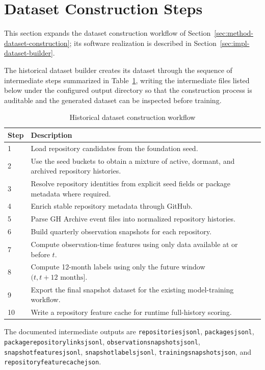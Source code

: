 \section{Dataset Construction Steps}
\label{appendix:dataset-construction}

This section expands the dataset construction workflow of Section~\ref{sec:method-dataset-construction}; its software realization is described in Section~\ref{sec:impl-dataset-builder}.

The historical dataset builder creates its dataset through the sequence of intermediate steps summarized in Table~\ref{tab:method-dataset-flow}, writing the intermediate files listed below under the configured output directory so that the construction process is auditable and the generated dataset can be inspected before training.

\begin{table}[htbp]
\centering
\caption{Historical dataset construction workflow}
\label{tab:method-dataset-flow}
\begin{tabular}{p{} p{}}
\hline
\textbf{Step} & \textbf{Description} \\
\hline
1 & Load repository candidates from the foundation seed. \\
2 & Use the seed buckets to obtain a mixture of active, dormant, and archived repository histories. \\
3 & Resolve repository identities from explicit seed fields or package metadata where required. \\
4 & Enrich stable repository metadata through GitHub. \\
5 & Parse GH Archive event files into normalized repository histories. \\
6 & Build quarterly observation snapshots for each repository. \\
7 & Compute observation-time features using only data available at or before \(t\). \\
8 & Compute 12-month labels using only the future window \((t, t + 12\text{ months}]\). \\
9 & Export the final snapshot dataset for the existing model-training workflow. \\
10 & Write a repository feature cache for runtime full-history scoring. \\
\hline
\end{tabular}
\end{table}

\begin{sloppypar}
The documented intermediate outputs are \texttt{repositories\sdot jsonl}, \texttt{packages\sdot jsonl}, \texttt{package\su repository\su links\sdot jsonl}, \texttt{observation\su snapshots\sdot jsonl}, \texttt{snapshot\su features\sdot jsonl}, \texttt{snapshot\su labels\sdot jsonl}, \texttt{training\su snapshots\sdot json}, and \texttt{repository\sdash feature\sdash cache\sdot json}.
\end{sloppypar}

